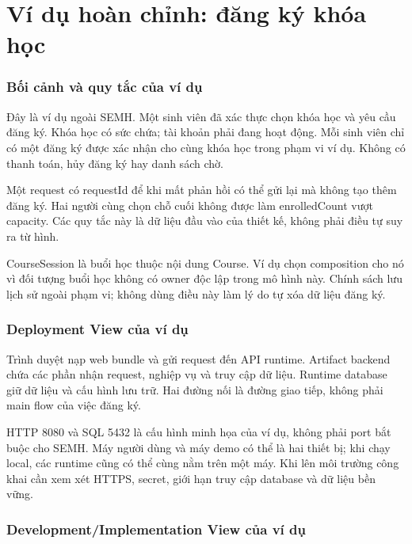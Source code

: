 \chapter{Ví dụ hoàn chỉnh: đăng ký khóa học}
\subsection{Bối cảnh và quy tắc của ví dụ}
Đây là ví dụ ngoài SEMH. Một sinh viên đã xác thực chọn khóa học và yêu cầu đăng ký. Khóa học có sức chứa; tài khoản phải đang hoạt động. Mỗi sinh viên chỉ có một đăng ký được xác nhận cho cùng khóa học trong phạm vi ví dụ. Không có thanh toán, hủy đăng ký hay danh sách chờ.

Một request có requestId để khi mất phản hồi có thể gửi lại mà không tạo thêm đăng ký. Hai người cùng chọn chỗ cuối không được làm enrolledCount vượt capacity. Các quy tắc này là dữ liệu đầu vào của thiết kế, không phải điều tự suy ra từ hình.

CourseSession là buổi học thuộc nội dung Course. Ví dụ chọn composition cho nó vì đối tượng buổi học không có owner độc lập trong mô hình này. Chính sách lưu lịch sử ngoài phạm vi; không dùng điều này làm lý do tự xóa dữ liệu đăng ký.

\subsection{Deployment View của ví dụ}

Trình duyệt nạp web bundle và gửi request đến API runtime. Artifact backend chứa các phần nhận request, nghiệp vụ và truy cập dữ liệu. Runtime database giữ dữ liệu và cấu hình lưu trữ. Hai đường nối là đường giao tiếp, không phải main flow của việc đăng ký.

HTTP 8080 và SQL 5432 là cấu hình minh họa của ví dụ, không phải port bắt buộc cho SEMH. Máy người dùng và máy demo có thể là hai thiết bị; khi chạy local, các runtime cũng có thể cùng nằm trên một máy. Khi lên môi trường công khai cần xem xét HTTPS, secret, giới hạn truy cập database và dữ liệu bền vững.

\subsection{Development/Implementation View của ví dụ}

